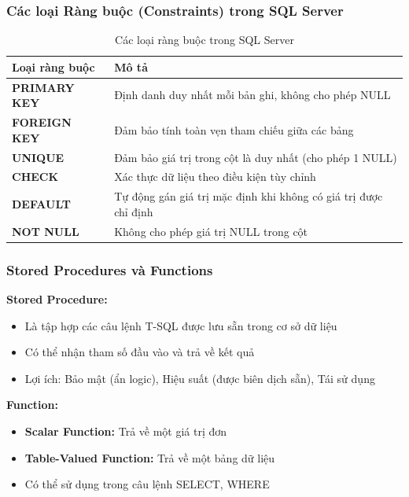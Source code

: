 \documentclass[12pt,a4paper]{article}
\begin{document}
\subsubsection{Các loại Ràng buộc (Constraints) trong SQL Server}

\begin{table}[H]
\centering
\caption{Các loại ràng buộc trong SQL Server}
\begin{tabular}{@{}|l|p{10cm}|@{}}
\hline
\textbf{Loại ràng buộc} & \textbf{Mô tả} \\ \hline
\textbf{PRIMARY KEY} & Định danh duy nhất mỗi bản ghi, không cho phép NULL \\ \hline
\textbf{FOREIGN KEY} & Đảm bảo tính toàn vẹn tham chiếu giữa các bảng \\ \hline
\textbf{UNIQUE} & Đảm bảo giá trị trong cột là duy nhất (cho phép 1 NULL) \\ \hline
\textbf{CHECK} & Xác thực dữ liệu theo điều kiện tùy chỉnh \\ \hline
\textbf{DEFAULT} & Tự động gán giá trị mặc định khi không có giá trị được chỉ định \\ \hline
\textbf{NOT NULL} & Không cho phép giá trị NULL trong cột \\ \hline
\end{tabular}
\end{table}

\subsubsection{Stored Procedures và Functions}

\textbf{Stored Procedure:}
\begin{itemize}
    \item Là tập hợp các câu lệnh T-SQL được lưu sẵn trong cơ sở dữ liệu
    \item Có thể nhận tham số đầu vào và trả về kết quả
    \item Lợi ích: Bảo mật (ẩn logic), Hiệu suất (được biên dịch sẵn), Tái sử dụng
\end{itemize}

\textbf{Function:}
\begin{itemize}
    \item \textbf{Scalar Function:} Trả về một giá trị đơn
    \item \textbf{Table-Valued Function:} Trả về một bảng dữ liệu
    \item Có thể sử dụng trong câu lệnh SELECT, WHERE
\end{itemize}
\end{document}
